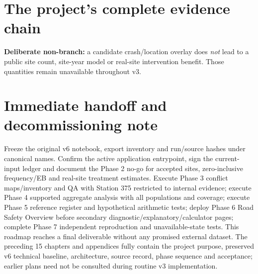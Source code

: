 \documentclass[11pt,a4paper,openany]{report}
\begin{document}
\section{The project's complete evidence chain}
\begin{center}
\end{center}
\textbf{Deliberate non-branch:} a candidate crash/location overlay does \emph{not} lead to a public site count, site-year model or real-site intervention benefit. Those quantities remain unavailable throughout v3.

\section{Immediate handoff and decommissioning note}
Freeze the original v6 notebook, export inventory and run/source hashes under canonical names. Confirm the active application entrypoint, sign the current-input ledger and document the Phase 2 no-go for accepted sites, zero-inclusive frequency/EB and real-site treatment estimates. Execute Phase 3 conflict maps/inventory and QA with Station 375 restricted to internal evidence; execute Phase 4 supported aggregate analysis with all populations and coverage; execute Phase 5 reference register and hypothetical arithmetic tests; deploy Phase 6 Road Safety Overview before secondary diagnostic/explanatory/calculator pages; complete Phase 7 independent reproduction and unavailable-state tests. This roadmap reaches a final deliverable without any promised external dataset. The preceding 15 chapters and appendices fully contain the project purpose, preserved v6 technical baseline, architecture, source record, phase sequence and acceptance; earlier plans need not be consulted during routine v3 implementation.
\end{document}
